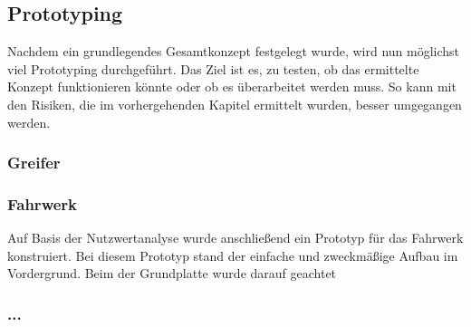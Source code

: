 \subsection{Prototyping}

Nachdem ein grundlegendes Gesamtkonzept festgelegt wurde, wird nun möglichst viel Prototyping durchgeführt. Das Ziel ist es, zu testen, ob das ermittelte Konzept funktionieren könnte oder ob es überarbeitet werden muss. So kann mit den Risiken, die im vorhergehenden Kapitel ermittelt wurden, besser umgegangen werden.

\subsubsection{Greifer}

\subsubsection{Fahrwerk}

Auf Basis der Nutzwertanalyse wurde anschließend ein Prototyp für das Fahrwerk konstruiert. Bei diesem Prototyp stand der einfache und zweckmäßige Aufbau im Vordergrund. Beim der Grundplatte wurde darauf geachtet

\subsubsection{...}

